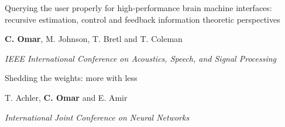 \documentclass[10pt,letterpaper]{article}
\renewenvironment{itemize}{
  \begin{list}{}{
    \setlength{\leftmargin}{1.25em}
    \setlength{\itemsep}{0.25em}
    \setlength{\parskip}{0pt}
    \setlength{\parsep}{0.2em}
  }
}{
  \end{list}
}
\begin{document}
\begin{enumerate}[leftmargin=*, labelindent=6.5em, font=\bfseries]
  \item[ICASSP 2008] Querying the user properly for high-performance brain machine interfaces: recursive estimation, control and feedback information theoretic perspectives
        \begin{itemize}
          \item \textbf{C. Omar}, M. Johnson, T. Bretl and T. Coleman
          \item \textit{IEEE International Conference on Acoustics, Speech, and Signal Processing}
        \end{itemize}
  \item[IJCNN 2008] Shedding the weights: more with less
        \begin{itemize}
          \item T. Achler, \textbf{C. Omar} and E. Amir
          \item \textit{International Joint Conference on Neural Networks}
        \end{itemize}

\end{enumerate}


\end{document}
